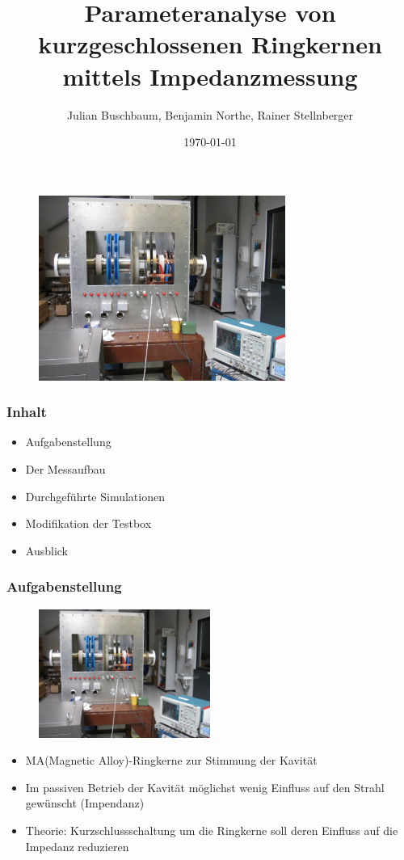 \documentclass[accentcolor=tud9b, colorbacktitle, inverttitle]{tudbeamer}
\author{Julian Buschbaum, Benjamin Northe, Rainer Stellnberger}
\institute{Institut TEMF}
\date{\today}
\title{Parameteranalyse von kurzgeschlossenen Ringkernen mittels Impedanzmessung}
\begin{document}
\begin{titleframe}
\vspace{-1em}
	\begin{figure}[h]
		\centering
		\includegraphics[width=0.72\textwidth]{Kavitaet}
	\end{figure}
\end{titleframe}





\begin{frame}\frametitle{Inhalt}
	\begin{itemize}
		\item Aufgabenstellung
		\item Der Messaufbau
		\item Durchgef\"uhrte Simulationen
		\item Modifikation der Testbox
		\item Ausblick
	\end{itemize}
\end{frame}


\begin{frame}\frametitle{Aufgabenstellung}
\begin{multicols}{2}
\vspace{-2em}
	\begin{figure}[h]
		\centering
		\includegraphics[width=0.5\textwidth]{Kavitaet}
	\end{figure}
	\vfill\null
	\columnbreak
	\begin{itemize}
		\item MA(Magnetic Alloy)-Ringkerne zur Stimmung der Kavit\"at
		\item Im passiven Betrieb der Kavit\"at m\"oglichst wenig Einfluss auf den Strahl gewünscht (Impendanz)
		\item Theorie: Kurzschlussschaltung um die Ringkerne soll deren Einfluss auf die Impedanz reduzieren
	\end{itemize}
\end{multicols}
\end{frame}
\end{document}
